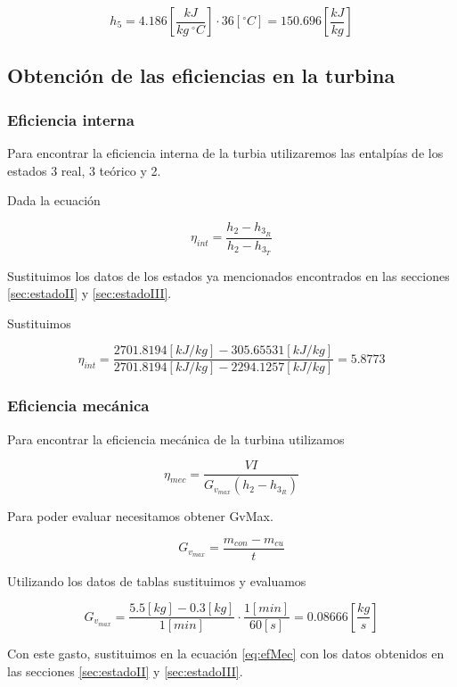 \documentclass[12pt,letterpaper]{article}
\begin{document}
$$
    h_5 = 4.186\left[\frac{kJ}{kg\ ^\circ C}\right] \cdot 36[^\circ C]
    = 150.696 \left[\frac{kJ}{kg}\right]
$$

\subsection{Obtención de las eficiencias en la turbina}

\subsubsection{Eficiencia interna}

Para encontrar la eficiencia interna de la turbia utilizaremos las entalpías de los estados 3 real, 3 teórico y 2.

Dada la ecuación 

\begin{equation}
    \eta_{int} = \frac{h_2 - h_{3_R}}{h_2 - h_{3_T}}
\end{equation}

Sustituimos los datos de los estados ya mencionados encontrados en 
las secciones \ref{sec:estadoII} y \ref{sec:estadoIII}.

Sustituimos

$$
    \eta_{int} = \frac{2701.8194 [kJ/kg] - 305.65531 [kJ/kg]}
    {2701.8194 [kJ/kg] - 2294.1257 [kJ/kg]} = 5.8773
$$

\subsubsection{Eficiencia mecánica}

Para encontrar la eficiencia mecánica de la turbina utilizamos

\begin{equation} \label{eq:efMec}
    \eta_{mec} = \frac{VI}{G_{v_{max}}(h_2 - h_{3_R})}
\end{equation}

Para poder evaluar necesitamos obtener GvMax. 

\begin{equation}
    G_{v_{max}} = \frac{m_{con} - m_{cu}}{t}    
\end{equation}

Utilizando los datos de tablas sustituimos y evaluamos 

$$
    G_{v_{max}} = \frac{5.5[kg] - 0.3[kg]}{1[min]} \cdot \frac{1[min]}{60[s]} = 0.08666 \left[\frac{kg}{s}\right]
$$

Con este gasto, sustituimos en la ecuación \ref{eq:efMec} con los datos obtenidos en 
las secciones \ref{sec:estadoII} y \ref{sec:estadoIII}.
\end{document}
